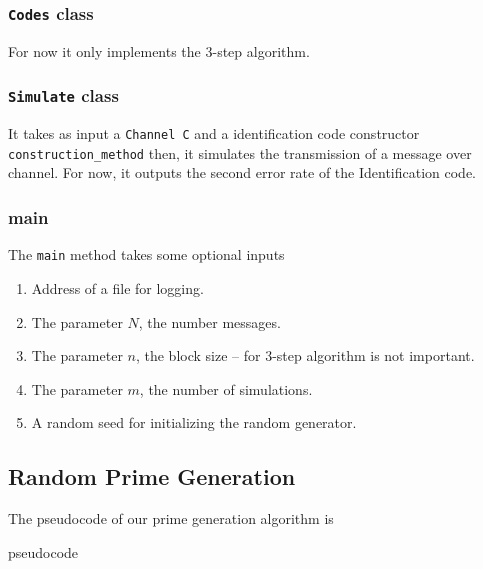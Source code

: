 \documentclass{article}
\begin{document}
\subsubsection{\texttt{Codes} class}

For now it only implements the 3-step algorithm.
\subsubsection{\texttt{Simulate} class}

It takes as input a \texttt{Channel C} and a identification code constructor \texttt{construction\_method} then, it simulates the transmission of a message over channel. For now, it outputs the second error rate of the Identification code. 
\subsubsection{main}

The \texttt{main} method takes some optional inputs 
\begin{enumerate}
	\item Address of a file for logging.
	\item The parameter \(N\), the number messages.
	\item The parameter \(n\), the block size -- for 3-step algorithm is not important.
	\item The parameter \(m\), the number of simulations.
	\item A random seed for initializing the random generator.
\end{enumerate}
\subsection{Random Prime Generation}
The pseudocode of our prime generation algorithm is 
\begin{algorithm}
	\DontPrintSemicolon
	\caption{pseudocode}
\end{algorithm}
\end{document}
